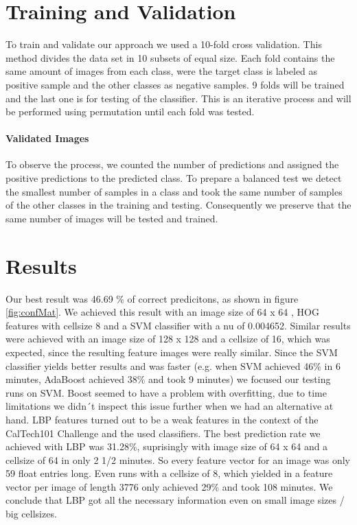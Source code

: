 \documentclass[a4paper,10pt]{article}
\begin{document}
\section{Training and Validation}
To train and validate our approach we used a 10-fold cross validation. 
This method divides the data set in 10 subsets of equal size. Each fold contains the same amount of images from each class, were the target class is labeled as positive sample and the other classes as negative samples. 9 folds will be trained and the last one is for testing of the classifier.
This is an iterative process and will be performed using permutation until each fold was tested.
\paragraph{Validated Images}
To observe the process, we counted the number of predictions and assigned the positive predictions to the predicted class.
To prepare a balanced test we detect the smallest number of samples in a class and took the same number of samples of the other classes in the training and testing. 
Consequently we preserve that the same number of images will be tested and trained.
\section{Results}
Our best result was 46.69 \% of correct predicitons, as shown in figure \ref{fig:confMat}.
We achieved this result with an image size of 64 x 64 , HOG features with cellsize 8 and a SVM classifier with a nu of 0.004652.
Similar results were achieved with an image size of 128 x 128 and a cellsize of 16, which was expected, since the resulting feature images were really similar.
Since the SVM classifier yields better results and was faster (e.g. when SVM achieved 46\% in 6 minutes, AdaBoost achieved 38\% and took 9 minutes) we focused our testing runs on SVM.
Boost seemed to have a problem with overfitting, due to time limitations we didn´t inspect this issue further when we had an alternative at hand.
LBP features turned out to be a weak features in the context of the CalTech101 Challenge and the used classifiers.
The best prediction rate we achieved with LBP was 31.28\%, suprisingly with image size of 64 x 64 and a cellsize of 64 in only 2 1/2 minutes. So every feature vector for an image was only 59 float entries long. Even runs with a cellsize of 8, which yielded in a feature vector per image of length 3776 only achieved 29\% and took 108 minutes.
We conclude that LBP got all the necessary information even on small image sizes / big cellsizes. 
\end{document}
